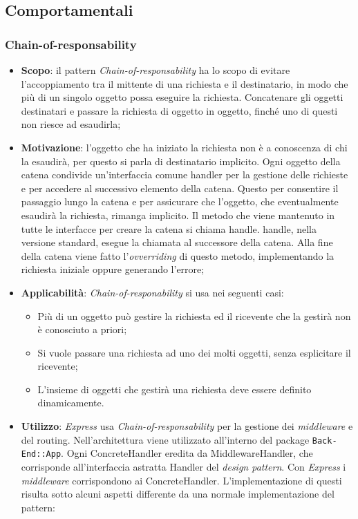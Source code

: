 \subsection{Comportamentali}
\subsubsection{Chain-of-responsability}
\begin{itemize}
\item \textbf{Scopo}: il pattern \textit{Chain-of-responsability} ha lo scopo di evitare l'accoppiamento tra il mittente di una richiesta e il destinatario, in modo che più di un singolo oggetto possa eseguire la richiesta. Concatenare gli oggetti destinatari e passare la richiesta di oggetto in oggetto, finché uno di questi non riesce ad esaudirla;
\item \textbf{Motivazione}: l'oggetto che ha iniziato la richiesta non è a conoscenza di chi la esaudirà, per questo si parla di destinatario implicito. Ogni oggetto della catena condivide un'interfaccia comune handler per la gestione delle richieste e per accedere al successivo elemento della catena. Questo per consentire il passaggio lungo la catena e per assicurare che l'oggetto, che eventualmente esaudirà la richiesta, rimanga implicito. Il metodo che viene mantenuto in tutte le interfacce per creare la catena si chiama handle. handle, nella versione standard, esegue la chiamata al successore della catena. Alla fine della catena viene fatto l'\textit{ovverriding} di questo metodo, implementando la richiesta iniziale oppure generando l'errore;
\item \textbf{Applicabilità}: \textit{Chain-of-responability} si usa nei seguenti casi:
	\begin{itemize}
		\item Più di un oggetto può gestire la richiesta ed il ricevente che la gestirà non è conosciuto a priori;
		\item Si vuole passare una richiesta ad uno dei molti oggetti, senza esplicitare il ricevente;
		\item L'insieme di oggetti che gestirà una richiesta deve essere definito dinamicamente.
	\end{itemize}
\item \textbf{Utilizzo}: \textit{Express} usa \textit{Chain-of-responsability} per la gestione dei \textit{middleware} e del routing. Nell'architettura viene utilizzato all'interno del package \texttt{Back-End::App}. Ogni ConcreteHandler eredita da MiddlewareHandler, che corrisponde all'interfaccia astratta Handler del \textit{design pattern}. Con \textit{Express} i \textit{middleware} corrispondono ai ConcreteHandler. L'implementazione di questi risulta sotto alcuni aspetti differente da una normale implementazione del pattern:

\end{itemize}
